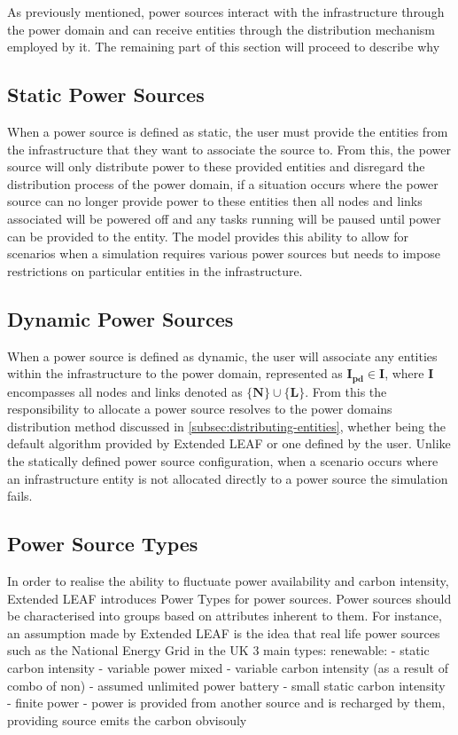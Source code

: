 \documentclass{l4proj}
\begin{document}
As previously mentioned, power sources interact with the infrastructure through the power domain and can receive entities through the distribution mechanism employed by it.
The remaining part of this section will proceed to describe why

\subsection{Static Power Sources}\label{subsec:static-power-sources}
When a power source is defined as static, the user must provide the entities from the infrastructure that they want to associate the source to.
From this, the power source will only distribute power to these provided entities and disregard the distribution process of the power domain, if a situation occurs where the power source can no longer provide power to these entities then all nodes and links associated will be powered off and any tasks running will be paused until power can be provided to the entity.
The model provides this ability to allow for scenarios when a simulation requires various power sources but needs to impose restrictions on particular entities in the infrastructure.

\subsection{Dynamic Power Sources}\label{subsec:dynamic-power-sources}
When a power source is defined as dynamic, the user will associate any entities within the infrastructure to the power domain, represented as $\mathbf{I_{pd} \in I}$, where $\mathbf{I}$ encompasses all nodes and links denoted as $\mathbf{\{N\} \cup \{L\}}$.
From this the responsibility to allocate a power source resolves to the power domains distribution method discussed in \ref{subsec:distributing-entities}, whether being the default algorithm provided by Extended LEAF or one defined by the user.
Unlike the statically defined power source configuration, when a scenario occurs where an infrastructure entity is not allocated directly to a power source the simulation fails.\\

\subsection{Power Source Types}\label{subsec:power-source-types}
In order to realise the ability to fluctuate power availability and carbon intensity, Extended LEAF introduces Power Types for power sources.
Power sources should be characterised into groups based on attributes inherent to them.
For instance, an assumption made by Extended LEAF is the idea that real life power sources such as the National Energy Grid in the UK
3 main types:
renewable:
    - static carbon intensity
    - variable power
mixed
    - variable carbon intensity (as a result of combo of non)
    - assumed unlimited power
battery
    - small static carbon intensity
    - finite power
    - power is provided from another source and is recharged by them, providing source emits the carbon obvisouly
\end{document}
